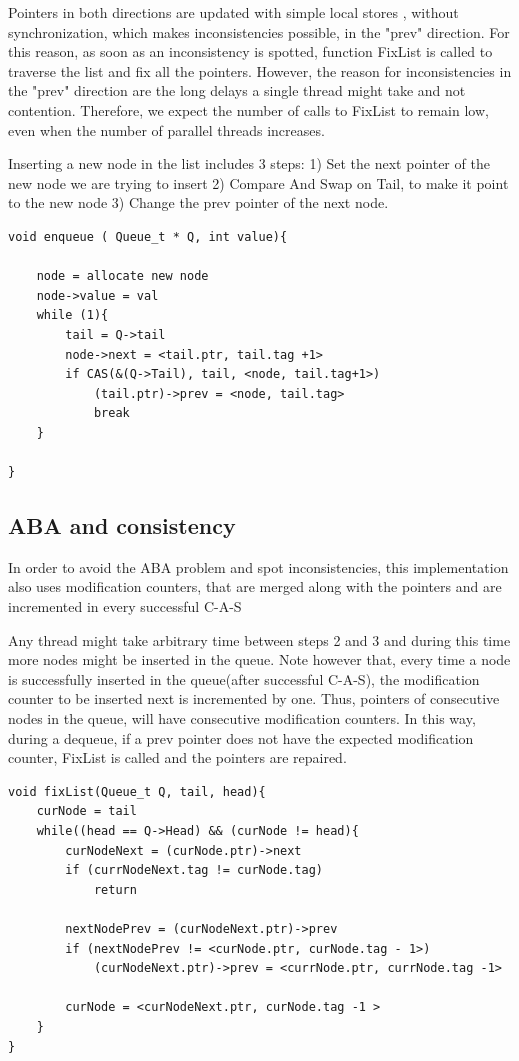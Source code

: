 Pointers in both directions are updated with simple local stores , without synchronization, which makes inconsistencies possible, in the "prev" direction. For this reason, as soon as an inconsistency is spotted, function FixList is called to traverse the list and fix all the pointers. However, the reason for inconsistencies in the "prev" direction are the long delays a single thread might take and not contention. Therefore, we expect the number of calls to FixList to remain low, even when the number of parallel threads increases.

Inserting a new node in the list includes 3 steps:
1) Set the next pointer of the new node we are trying to insert
2) Compare And Swap on Tail, to make it point to the new node
3) Change the prev pointer of the next node.

\begin{lstlisting}[caption={Enqueue operation of the optimistic queue}]
void enqueue ( Queue_t * Q, int value){
	
	node = allocate new node
	node->value = val
	while (1){
		tail = Q->tail
		node->next = <tail.ptr, tail.tag +1>
		if CAS(&(Q->Tail), tail, <node, tail.tag+1>)
			(tail.ptr)->prev = <node, tail.tag>
			break
	}

}

\end{lstlisting}
\subsection{ABA and consistency}

In order to avoid the ABA problem and spot inconsistencies, this implementation also uses modification counters, that are merged along with the pointers and are incremented in every successful C-A-S

Any thread might take arbitrary time  between steps 2 and 3 and during this time more nodes might be inserted in the queue. Note however that, every time a node is successfully inserted in the queue(after successful C-A-S), the modification counter to be inserted next is incremented by one. Thus, pointers of consecutive nodes in the queue, will have consecutive modification counters. In this way, during a dequeue, if a prev pointer does not have the expected modification counter, FixList is called and the pointers are repaired.

\begin{lstlisting}[caption={The function used to fix pointers along the prev direction}]
void fixList(Queue_t Q, tail, head){
	curNode = tail
	while((head == Q->Head) && (curNode != head){
		curNodeNext = (curNode.ptr)->next
		if (currNodeNext.tag != curNode.tag)
			return
		
		nextNodePrev = (curNodeNext.ptr)->prev
		if (nextNodePrev != <curNode.ptr, curNode.tag - 1>)
			(curNodeNext.ptr)->prev = <currNode.ptr, currNode.tag -1>
		
		curNode = <curNodeNext.ptr, curNode.tag -1 >
	}
}
\end{lstlisting}

